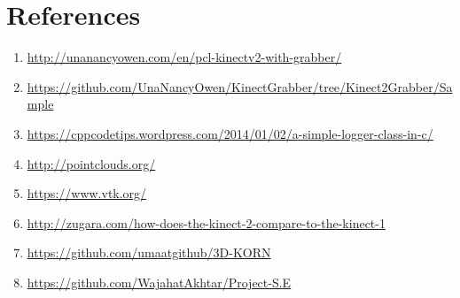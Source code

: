 \documentclass[aps,letterpaper,11pt]{revtex4}
\begin{document}
\pagebreak

\section{References}
\begin{enumerate}
\item \url{http://unanancyowen.com/en/pcl-kinectv2-with-grabber/}
\item \url{https://github.com/UnaNancyOwen/KinectGrabber/tree/Kinect2Grabber/Sample}
\item \url{https://cppcodetips.wordpress.com/2014/01/02/a-simple-logger-class-in-c/}
\item \url{http://pointclouds.org/}
\item \url{https://www.vtk.org/}
\item \url{http://zugara.com/how-does-the-kinect-2-compare-to-the-kinect-1}
\item \url{https://github.com/umaatgithub/3D-KORN}
\item \url{https://github.com/WajahatAkhtar/Project-S.E}
\end{enumerate}
\end{document}
